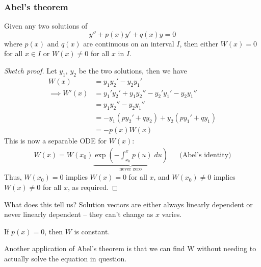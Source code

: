 \documentclass{../template/note}
\begin{document}
    
    \subsubsection{Abel's theorem}

    \begin{theorem}
        Given any two solutions of
        \[
            y'' + p(x)y' + q(x)y = 0
        \]
        where \(p(x)\) and \(q(x)\) are continuous on an interval \(I\), then either \(W(x) = 0\) for all \(x \in I\) or \(W(x) \neq 0\) for all \(x\) in \(I\).
    \end{theorem}
    
    \begin{proof}[Sketch proof]
        Let \(y_1\), \(y_2\) be the two solutions, then we have
        \begin{align*}
            W(x) &= y_1y_2' - y_2y_1' \\
            \implies W'(x) &= y_1'y_2' + y_1y_2'' - y_2'y_1' - y_2y_1'' \\
            &= y_1y_2'' - y_2y_1'' \\
            &= -y_1(py_2' + qy_2) + y_2(py_1'+qy_1) \\
            &= -p(x)W(x)
        \end{align*}
        This is now a separable ODE for \(W(x)\):
        \begin{align*}
            W(x) = W(x_0) \underbrace{\exp\left(-\int_{x_0}^x p(u) \; du\right)}_{\text{never zero}} && \text{(Abel's identity)}
        \end{align*}
        Thus, \(W(x_0) = 0\) implies \(W(x) = 0\) for all \(x\), and \(W(x_0) \neq 0\) implies \(W(x) \neq 0\) for all \(x\), as required.
    \end{proof}
    
    What does this tell us? Solution vectors are either always linearly dependent or never linearly dependent -- they can't change as \(x\) varies.

    \begin{corollary}
        If \(p(x) = 0\), then \(W\) is constant.
    \end{corollary}
    
    Another application of Abel's theorem is that we can find W without needing to actually solve the equation in question.
\end{document}
